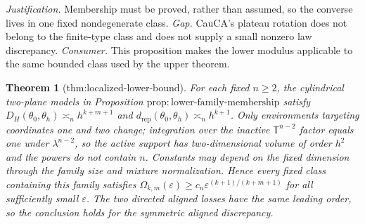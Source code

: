 \documentclass{article}
\newtheorem{theorem}{Theorem}
\begin{document}
\par\smallskip\noindent \textit{Justification.} Membership must be proved, rather than assumed, so the converse lives in one fixed nondegenerate class. \textit{Gap.} CauCA's plateau rotation does not belong to the finite-type class and does not supply a small nonzero law discrepancy. \textit{Consumer.} This proposition makes the lower modulus applicable to the same bounded class used by the upper theorem.

\begin{theorem}[thm:localized-lower-bound]\label{thm:localized-lower-bound}
For each fixed \(n\ge2\), the cylindrical two-plane models in Proposition \(\mathrm{prop:lower\text{-}family\text{-}membership}\) satisfy \(D_H(\theta_0,\theta_h)\asymp_n h^{k+m+1}\) and \(d_{\mathrm{rep}}(\theta_0,\theta_h)\asymp_n h^{k+1}\). Only environments targeting coordinates one and two change; integration over the inactive \(\mathbb T^{n-2}\) factor equals one under \(\lambda^{n-2}\), so the active support has two-dimensional volume of order \(h^2\) and the powers do not contain \(n\). Constants may depend on the fixed dimension through the family size and mixture normalization. Hence every fixed class containing this family satisfies \(\Omega_{k,m}(\varepsilon)\ge c_n\varepsilon^{(k+1)/(k+m+1)}\) for all sufficiently small \(\varepsilon\). The two directed aligned losses have the same leading order, so the conclusion holds for the symmetric aligned discrepancy.
\end{theorem}
\end{document}
